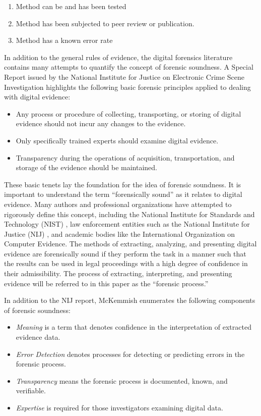 \begin{enumerate}
  \item Method can be and has been tested
  \item Method has been subjected to peer review or publication.
  \item Method has a known error rate
\end{enumerate}

In addition to the general rules of evidence, the digital forensics literature contains many attempts to quantify the concept of forensic soundness.
A Special Report issued by the National Institute for Justice on Electronic Crime Scene Investigation \cite{NIJ2008} highlights the following basic forensic 
principles applied to dealing with digital evidence:

\begin{itemize}
\item Any process or procedure of collecting, transporting, or storing of digital evidence should not incur any changes to the evidence.
\item Only specifically trained experts should examine digital evidence.
\item Transparency during the operations of acquisition, transportation, and storage of the evidence should be maintained.
\end{itemize}

These basic tenets lay the foundation for the idea of forensic soundness. It is important to understand the term “forensically sound” 
as it relates to digital evidence. Many authors and professional organizations have attempted to rigorously define this concept, 
including the National Institute for Standards and Technology (NIST) \cite{NIST2001}, law enforcement entities such as the National Institute for 
Justice (NIJ) \cite{NIJ2008}, and academic bodies like the International Organization on Computer Evidence\cite{IOCE2002}. The methods of extracting, analyzing, 
and presenting digital evidence are forensically sound if they perform the task in a manner such that the results can be used in legal 
proceedings with a high degree of confidence in their admissibility. The process of extracting, interpreting, and presenting evidence 
will be referred to in this paper as the “forensic process.”

In addition to the NIJ report, McKemmish \cite{mckemmish2008} enumerates the following components of forensic soundness:

\begin{itemize}
\item \emph{Meaning} is a term that denotes confidence in the interpretation of extracted evidence data.
\item \emph{Error Detection} denotes processes for detecting or predicting errors in the forensic process.
\item \emph{Transparency} means the forensic process is documented, known, and verifiable.
\item \emph{Expertise} is required for those investigators examining digital data.
\end{itemize}

